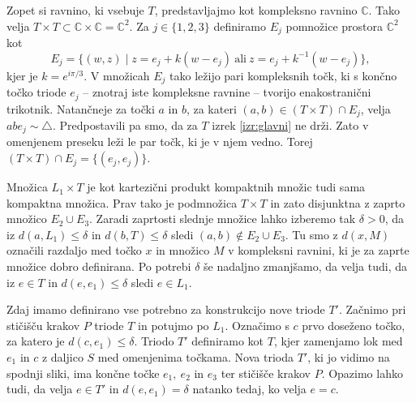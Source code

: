 \documentclass[mat1]{fmfdelo}
\newcommand{\C}{\mathbb C}
\begin{document}
\proof
Zopet si ravnino, ki vsebuje $T$, predstavljajmo kot kompleksno ravnino $\C$. Tako velja $T \times T \subset \C \times \C = \C^2$. Za $j \in \{1, 2, 3\}$ definiramo $E_j$ pomnožice prostora $\C^2$ kot
\[
E_j = \{(w, z) \mid z = e_j + k(w-e_j)\ \text{ali}\ z = e_j + k^{-1}(w-e_j)\},
\]
kjer je $k = e^{i\pi / 3}$. V množicah $E_j$ tako ležijo pari kompleksnih točk, ki s končno točko triode $e_j$ -- znotraj iste kompleksne ravnine -- tvorijo enakostranični trikotnik. Natančneje za točki $a$ in $b$, za kateri $(a, b) \in (T \times T) \cap E_j$, velja $abe_j \sim \triangle$. Predpostavili pa smo, da za $T$ izrek \ref{izr:glavni} ne drži. Zato v omenjenem preseku leži le par točk, ki je v njem vedno. Torej $(T \times T) \cap E_j = \{(e_j, e_j)\}$.

Množica $L_1 \times T$ je kot kartezični produkt kompaktnih množic tudi sama kompaktna množica. Prav tako je podmnožica $T \times T$ in zato disjunktna z zaprto množico $E_2 \cup E_3$. Zaradi zaprtosti slednje množice lahko izberemo tak $\delta > 0$, da iz $d(a, L_1)\leq \delta$ in $d(b, T)\leq \delta$ sledi $(a, b) \notin E_2 \cup E_3$. Tu smo z $d(x, M)$ označili razdaljo med točko $x$ in množico $M$ v kompleksni ravnini, ki je za zaprte množice dobro definirana. Po potrebi $\delta$ še nadaljno zmanjšamo, da velja tudi, da iz $e \in T$ in $d(e, e_1) \leq \delta$ sledi $e \in L_1$.

Zdaj imamo definirano vse potrebno za konstrukcijo nove triode $T'$. Začnimo pri stičišču krakov $P$ triode $T$ in potujmo po $L_1$. Označimo s $c$ prvo doseženo točko, za katero je $d(c, e_1) \leq \delta$. Triodo $T'$ definiramo kot $T$, kjer zamenjamo lok med $e_1$ in $c$ z daljico $S$ med omenjenima točkama. Nova trioda $T'$, ki jo vidimo na spodnji sliki, ima končne točke $e_1,\ e_2$ in $e_3$ ter stičišče krakov $P$. Opazimo lahko tudi, da velja $e \in T'$ in $d(e, e_1) = \delta$ natanko tedaj, ko velja $e=c$.

\begin{center}
\end{center}
\end{document}
